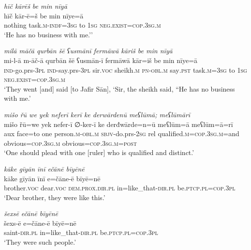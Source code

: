 \ea \label{ŠJ.76}
\textit{hīč kārēš be min nīyā} \\ 
\gll hīč kār-ē=š be min nīye=ā \\ 
 nothing task\textsc{.m}\textsc{-indf}\textsc{=3sg} to \textsc{1sg} \textsc{\textsc{neg.}exist}\textsc{=cop}\textsc{.3sg}\textsc{.m} \\ 
\glt `He has no business with me.’'
\z 
 
\ea \label{ŠJ.77}
\textit{milā māčā qurbān šē ʕusmānī fermāwā kāriš be min nīyā} \\ 
\gll mi-l-ā m-āč-ā qurbān šē ʕusmān-ī fermāwā kār=iš be min nīye=ā \\ 
 \textsc{ind-}go.prs\textsc{-3pl} \textsc{ind-}say.prs\textsc{-3pl} sir.\textsc{voc} sheikh\textsc{.m} \textsc{pn}\textsc{-obl}\textsc{.m} say\textsc{.pst} task\textsc{.m}\textsc{=3sg} to \textsc{1sg} \textsc{\textsc{neg.}exist}\textsc{=cop}\textsc{.3sg}\textsc{.m} \\ 
\glt `They went [and] said [to Jafir Sān], ‘Sir, the sheikh said, “He has no business with me.'
\z 
 
\ea \label{ŠJ.92}
\textit{mišo řū we yek neferī kerī ke derwārdenū meʕlūmā; meʕlūmārī} \\ 
\gll mišo řū=we yek nefer-ī ∅-ker-ī ke derđwārde=n=ū meʕlūm=ā meʕlūm=ā=rī \\ 
 aux face=to one person\textsc{.m}\textsc{-obl}\textsc{.m} \textsc{sbjv-}do.prs-\textsc{2sg} rel qualified\textsc{.m}\textsc{=cop}\textsc{.3sg}\textsc{.m}=and obvious\textsc{=cop}\textsc{.3sg}\textsc{.m} obvious\textsc{=cop}\textsc{.3sg}\textsc{.m}\textsc{=\textsc{post}} \\ 
\glt `One should plead with one [ruler] who is qualified and distinct.'
\z 
 
\ea \label{ŠJ.99}
\textit{kāke gīyān īnī ečānē bīyēnē} \\ 
\gll kāke gīyān īnī e=čāne-ē bīyē=nē \\ 
 brother.\textsc{voc} dear.\textsc{voc} \textsc{dem.prox}\textsc{.dir}\textsc{.pl} in=like\_that\textsc{-dir}\textsc{.pl} be\textsc{.ptcp}\textsc{.pl}\textsc{=cop}\textsc{.3pl} \\ 
\glt `Dear brother, they were like this.'
\z 
 
\ea \label{ŠJ.100}
\textit{šexsē ečānē bīyēnē} \\ 
\gll šexs-ē e=čāne-ē bīyē=nē \\ 
 saint\textsc{-dir}\textsc{.pl} in=like\_that\textsc{-dir}\textsc{.pl} be\textsc{.ptcp}\textsc{.pl}\textsc{=cop}\textsc{.3pl} \\ 
\glt `They were such people.'
\z 
 
